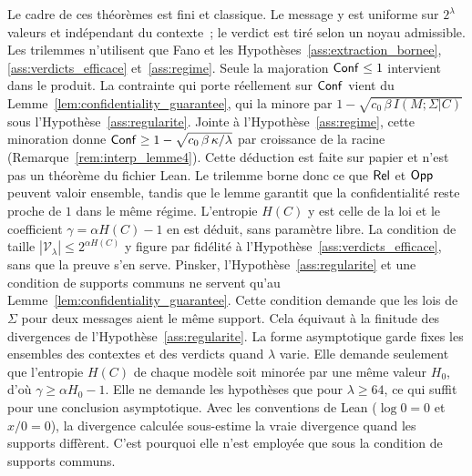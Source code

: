 \begin{sloppypar}
Le cadre de ces th\'eor\`emes est fini et classique. Le message y est uniforme sur
$2^\lambda$ valeurs et ind\'ependant du contexte~; le verdict est tir\'e selon un noyau
admissible. Les trilemmes n'utilisent que Fano et les
Hypoth\`eses~\ref{ass:extraction_bornee}, \ref{ass:verdicts_efficace} et~\ref{ass:regime}.
Seule la majoration $\mathsf{Conf} \leq 1$ intervient dans le produit. La contrainte qui
porte r\'eellement sur $\mathsf{Conf}$ vient du Lemme~\ref{lem:confidentiality_guarantee}, qui
la minore par $1 - \sqrt{c_0\,\beta\, I(M;\Sigma|C)}$ sous
l'Hypoth\`ese~\ref{ass:regularite}. Jointe \`a l'Hypoth\`ese~\ref{ass:regime}, cette minoration
donne $\mathsf{Conf} \geq 1 - \sqrt{c_0\,\beta\,\kappa/\lambda}$ par croissance de la racine (Remarque~\ref{rem:interp_lemme4}). Cette d\'eduction est faite sur papier et n'est pas un th\'eor\`eme du fichier Lean. Le trilemme borne donc ce que
$\mathsf{Rel}$ et $\mathsf{Opp}$ peuvent valoir ensemble, tandis que le lemme garantit que la
confidentialit\'e reste proche de $1$ dans le m\^eme r\'egime.
L'entropie $H(C)$ y est celle de la loi et le coefficient $\gamma = \alpha H(C) - 1$
en est d\'eduit, sans param\`etre libre. La condition de taille
$|\mathcal{V}_\lambda| \leq 2^{\alpha H(C)}$ y figure par fid\'elit\'e \`a
l'Hypoth\`ese~\ref{ass:verdicts_efficace}, sans que la preuve s'en serve. Pinsker,
l'Hypoth\`ese~\ref{ass:regularite} et une condition de supports communs ne servent
qu'au Lemme~\ref{lem:confidentiality_guarantee}. Cette condition demande que les lois de
$\Sigma$ pour deux messages aient le m\^eme support. Cela \'equivaut \`a la finitude des
divergences de l'Hypoth\`ese~\ref{ass:regularite}. La forme asymptotique garde fixes les
ensembles des contextes et des verdicts quand $\lambda$ varie. Elle demande seulement que
l'entropie $H(C)$ de chaque mod\`ele soit minor\'ee par une m\^eme valeur $H_0$, d'o\`u
$\gamma \geq \alpha H_0 - 1$. Elle ne demande les hypoth\`eses que pour $\lambda \geq 64$, ce qui suffit pour une conclusion asymptotique. Avec les
conventions de Lean ($\log 0 = 0$ et $x/0 = 0$), la divergence calcul\'ee sous-estime la
vraie divergence quand les supports diff\`erent. C'est pourquoi elle n'est employ\'ee que
sous la condition de supports communs.


\end{sloppypar}
